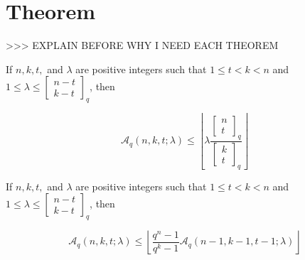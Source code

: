 \section{Theorem}

>\textcompwordmark >\textcompwordmark > EXPLAIN BEFORE WHY I NEED
EACH THEOREM \cite{Zhang:2019}
\begin{thm}
If $n,k,t,$ and $\lambda$ are positive integers such that $1\leq t<k<n$
and $1\leq\lambda\leq\left[\begin{array}{c}
n-t\\
k-t
\end{array}\right]_{q}$, then

\[
\mathcal{A}_{q}\left(n,k,t;\lambda\right)\leq\left\lfloor \lambda\frac{\left[\begin{array}{c}
n\\
t
\end{array}\right]_{q}}{\left[\begin{array}{c}
k\\
t
\end{array}\right]_{q}}\right\rfloor 
\]
\end{thm}
%
\begin{thm}
If $n,k,t,$ and $\lambda$ are positive integers such that $1\leq t<k<n$
and $1\leq\lambda\leq\left[\begin{array}{c}
n-t\\
k-t
\end{array}\right]_{q}$, then

\[
\mathcal{A}_{q}\left(n,k,t;\lambda\right)\leq\left\lfloor \frac{q^{n}-1}{q^{k}-1}\mathcal{A}_{q}\left(n-1,k-1,t-1;\lambda\right)\right\rfloor 
\]
\end{thm}
\clearpage